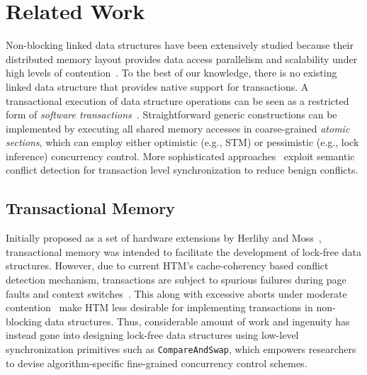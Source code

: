 \documentclass[10pt,conference,compsocconf]{IEEEtran}
\begin{document}
\section{Related Work}
\label{sec:related}
Non-blocking linked data structures have been extensively studied because their distributed memory layout provides data access parallelism and scalability under high levels of contention~\cite{linden2013skiplist,zhang2015lockfree,michael2002high}.
To the best of our knowledge, there is no existing linked data structure that provides native support for transactions.
A transactional execution of data structure operations can be seen as a restricted form of \emph{software transactions}~\cite{harris2010transactional}.
Straightforward generic constructions can be implemented by executing all shared memory accesses in coarse-grained \emph{atomic sections}, which can employ either optimistic (e.g., STM) or pessimistic (e.g., lock inference) concurrency control.
More sophisticated approaches~\cite{bronson2010transactional,herlihy2008transactional,golan2015automatic} exploit semantic conflict detection for transaction level synchronization to reduce benign conflicts.

\subsection{Transactional Memory}
Initially proposed as a set of hardware extensions by Herlihy and Moss~\cite{herlihy1993transactional}, transactional memory was intended to facilitate the development of lock-free data structures.
However, due to current HTM's cache-coherency based conflict detection mechanism, transactions are subject to spurious failures during page faults and context switches~\cite{dice2009early}.
This along with excessive aborts under moderate contention~\cite{christina2015resource} make HTM less desirable for implementing transactions in non-blocking data structures.
Thus, considerable amount of work and ingenuity has instead gone into designing lock-free data structures using low-level synchronization primitives such as \texttt{CompareAndSwap}, which empowers researchers to devise algorithm-specific fine-grained concurrency control schemes.
\end{document}
